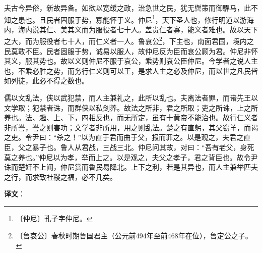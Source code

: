 \documentclass[12pt,UTF-8,openany]{ctexbook}
\begin{document}
\begin{normalsize}
    夫古今异俗，新故异备。如欲以宽缓之政，治急世之民，犹无辔策而御駻马，此不知之患也。且民者固服于势，寡能怀于义。仲尼\footnote{〔仲尼〕孔子字仲尼。}，天下圣人也，修行明道以游海内，海内说其仁、美其义而为服役者七十人。盖贵仁者寡，能义者难也。故以天下之大，而为服役者七十人，而仁义者一人。鲁哀公\footnote{〔鲁哀公〕春秋时期鲁国君主（公元前494年至前468年在位），鲁定公之子。}，下主也，南面君国，境内之民莫敢不臣。民者固服于势，诚易以服人，故仲尼反为臣而哀公顾为君。仲尼非怀其义，服其势也。故以义则仲尼不服于哀公，乘势则哀公臣仲尼。今学者之说人主也，不乘必胜之势，而务行仁义则可以王，是求人主之必及仲尼，而以世之凡民皆如列徒，此必不得之数也。
    
    儒以文乱法，侠以武犯禁，而人主兼礼之，此所以乱也。夫离法者罪，而诸先王以文学取；犯禁者诛，而群侠以私剑养。故法之所非，君之所取；吏之所诛，上之所养也。法、趣、上、下，四相反也，而无所定，虽有十黄帝不能治也。故行仁义者非所誉，誉之则害功；文学者非所用，用之则乱法。楚之有直躬，其父窃羊，而谒之吏。令尹曰：“杀之！”以为直于君而曲于父，报而罪之。以是观之，夫君之直臣，父之暴子也。鲁人从君战，三战三北。仲尼问其故，对曰：“吾有老父，身死莫之养也。”仲尼以为孝，举而上之。以是观之，夫父之孝子，君之背臣也。故令尹诛而楚奸不上闻，仲尼赏而鲁民易降北。上下之利，若是其异也，而人主兼举匹夫之行，而求致社稷之福，必不几矣。
\end{normalsize}


\newpage

\textbf{译文}：

\vspace{1em}
\end{document}
